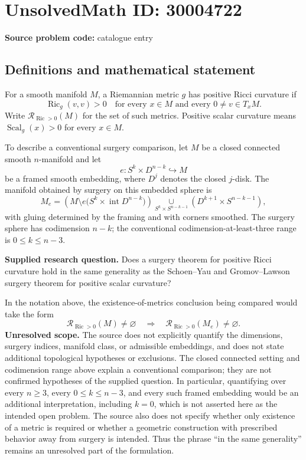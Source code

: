 \documentclass[11pt]{article}
\begin{document}
\section*{UnsolvedMath ID: 30004722}
\textbf{Source problem code:} catalogue entry
\subsection{Definitions and mathematical statement}
For a smooth manifold \(M\), a Riemannian metric \(g\) has positive Ricci curvature if
\[
\operatorname{Ric}_g(v,v)>0
\quad\text{for every }x\in M\text{ and every }0\ne v\in T_xM.
\]
Write \(\mathcal R_{\operatorname{Ric}>0}(M)\) for the set of such metrics. Positive scalar curvature means \(\operatorname{Scal}_g(x)>0\) for every \(x\in M\).

To describe a conventional surgery comparison, let \(M\) be a closed connected smooth \(n\)-manifold and let
\[
e:S^k\times D^{n-k}\hookrightarrow M
\]
be a framed smooth embedding, where \(D^j\) denotes the closed \(j\)-disk. The manifold obtained by surgery on this embedded sphere is
\[
M_e=\left(M\setminus e\bigl(S^k\times\operatorname{int}D^{n-k}\bigr)\right)
\underset{S^k\times S^{n-k-1}}{\cup}
\left(D^{k+1}\times S^{n-k-1}\right),
\]
with gluing determined by the framing and with corners smoothed. The surgery sphere has codimension \(n-k\); the conventional codimension-at-least-three range is \(0\le k\le n-3\).

\textbf{Supplied research question.} Does a surgery theorem for positive Ricci curvature hold in the same generality as the Schoen--Yau and Gromov--Lawson surgery theorem for positive scalar curvature?

In the notation above, the existence-of-metrics conclusion being compared would take the form
\[
\mathcal R_{\operatorname{Ric}>0}(M)\ne\varnothing
\quad\Longrightarrow\quad
\mathcal R_{\operatorname{Ric}>0}(M_e)\ne\varnothing.
\]
\textbf{Unresolved scope.} The source does not explicitly quantify the dimensions, surgery indices, manifold class, or admissible embeddings, and does not state additional topological hypotheses or exclusions. The closed connected setting and codimension range above explain a conventional comparison; they are not confirmed hypotheses of the supplied question. In particular, quantifying over every \(n\ge3\), every \(0\le k\le n-3\), and every such framed embedding would be an additional interpretation, including \(k=0\), which is not asserted here as the intended open problem. The source also does not specify whether only existence of a metric is required or whether a geometric construction with prescribed behavior away from surgery is intended. Thus the phrase ``in the same generality'' remains an unresolved part of the formulation.
\end{document}
